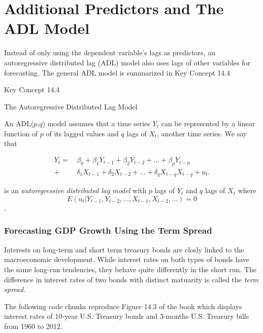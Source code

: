 \documentclass[]{book}
\theoremstyle{definition}
\theoremstyle{definition}
\theoremstyle{definition}
\theoremstyle{remark}
\begin{document}
\section{Additional Predictors and The ADL
Model}\label{additional-predictors-and-the-adl-model}

Instead of only using the dependent variable's lags as predictors, an
autoregressive distributed lag (ADL) model also uses lags of other
variables for forecasting. The general ADL model is summarized in Key
Concept 14.4

Key Concept 14.4

The Autoregressive Distributed Lag Model

An ADL(\(p\),\(q\)) model assumes that a time series \(Y_t\) can be
represented by a linear function of \(p\) of its lagged values and \(q\)
lags of \(X_t\), another time series. We say that

\begin{align*}
  Y_t =& \, \beta_0 + \beta_1 Y_{t-1} + \beta_2 Y_{t-2} + \dots + \beta_p Y_{t-p} \\ 
      +& \, \delta_1 X_{t-1} + \delta_2 X_{t-2} + \dots + \delta_q X_{t-q} X_{t-q} + u_t.
\end{align*}

is an \emph{autoregressive distributed lag model} with \(p\) lags of
\(Y_t\) and \(q\) lags of \(X_t\) where
\[E(u_t\vert Y_{t-1}, Y_{t-2}, \dots, X_{t-1}, X_{t-2}, \dots)=0\].

\subsubsection*{Forecasting GDP Growth Using the Term
Spread}\label{forecasting-gdp-growth-using-the-term-spread}

Interests on long-term and short term treasury bonds are closly linked
to the macroeconomic development. While interest rates on both types of
bonds have the same long-run tendencies, they behave quite differently
in the short run. The difference in interest rates of two bonds with
distinct matuarity is called the \emph{term spread}.

The following code chunks reproduce Figure 14.3 of the book which
displays interest rates of 10-year U.S. Treasury bonds and 3-months U.S.
Treasury bills from 1960 to 2012.
\end{document}
